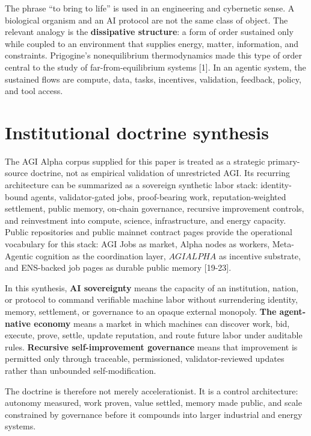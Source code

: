 The phrase ``to bring to life'' is used in an engineering and cybernetic
sense. A biological organism and an AI protocol are not the same class
of object. The relevant analogy is the \textbf{dissipative structure}: a
form of order sustained only while coupled to an environment that
supplies energy, matter, information, and constraints. Prigogine's
nonequilibrium thermodynamics made this type of order central to the
study of far-from-equilibrium systems {[}1{]}. In an agentic system, the
sustained flows are compute, data, tasks, incentives, validation,
feedback, policy, and tool access.

\section{Institutional doctrine
synthesis}\label{institutional-doctrine-synthesis}

The AGI Alpha corpus supplied for this paper is treated as a strategic
primary-source doctrine, not as empirical validation of unrestricted
AGI. Its recurring architecture can be summarized as a sovereign
synthetic labor stack: identity-bound agents, validator-gated jobs,
proof-bearing work, reputation-weighted settlement, public memory,
on-chain governance, recursive improvement controls, and reinvestment
into compute, science, infrastructure, and energy capacity. Public
repositories and public mainnet contract pages provide the operational
vocabulary for this stack: AGI Jobs as market, Alpha nodes as workers,
Meta-Agentic cognition as the coordination layer, \(AGIALPHA\) as
incentive substrate, and ENS-backed job pages as durable public memory
{[}19-23{]}.

In this synthesis, \textbf{AI sovereignty} means the capacity of an
institution, nation, or protocol to command verifiable machine labor
without surrendering identity, memory, settlement, or governance to an
opaque external monopoly. \textbf{The agent-native economy} means a
market in which machines can discover work, bid, execute, prove, settle,
update reputation, and route future labor under auditable rules.
\textbf{Recursive self-improvement governance} means that improvement is
permitted only through traceable, permissioned, validator-reviewed
updates rather than unbounded self-modification.

The doctrine is therefore not merely accelerationist. It is a control
architecture: autonomy measured, work proven, value settled, memory made
public, and scale constrained by governance before it compounds into
larger industrial and energy systems.

